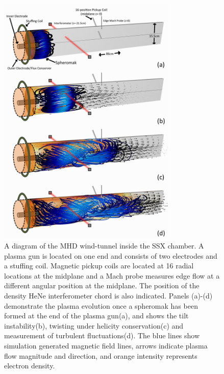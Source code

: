 \documentclass[aip,prl,amsmath,amssymb,reprint,superscriptaddress]{revtex4-1} %
\begin{document}
\begin{figure}[!htbp]
\centerline{
\includegraphics[width=8.5cm]{simulation_diagram_4panel.png}}
\caption{\label{fig:moviestills} A diagram of the MHD wind-tunnel inside the SSX chamber. A plasma gun is located on one end and consists of two electrodes and a stuffing coil. Magnetic pickup coils are located at 16 radial locations at the midplane and a Mach probe measures edge flow at a different angular position at the midplane. The position of the density HeNe interferometer chord is also indicated. Panels (a)-(d) demonstrate the plasma evolution once a spheromak has been formed at the end of the plasma gun(a), and shows the tilt instability(b), twisting under helicity conservation(c) and measurement of turbulent fluctuations(d). The blue lines show simulation generated magnetic field lines, arrows indicate plasma flow magnitude and direction, and orange intensity represents electron density.}
\end{figure}
\end{document}
